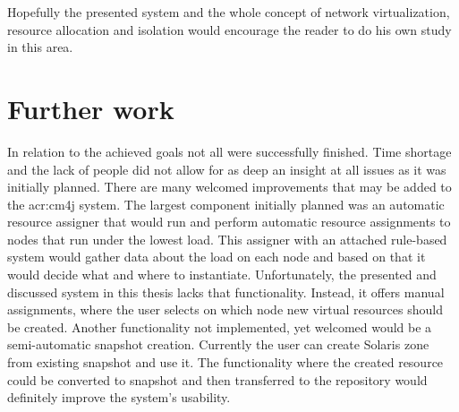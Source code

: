 \documentclass[11pt,openany]{book}
\begin{document}
      Hopefully the presented system and the whole concept of network virtualization, resource allocation and isolation
      would encourage the reader to do his own study in this area.
		

    \section{Further work}
		\label{sub:sum:further}
	
      In relation to the achieved goals not all were successfully finished. Time shortage and the lack of people did not
      allow for as deep an insight at all issues as it was initially planned. There are many welcomed improvements that
      may be added to the \gls{acr:cm4j} system. The largest component initially planned was an automatic resource
      assigner that would run and perform automatic resource assignments to nodes that run under the lowest load. This
      assigner with an attached rule-based system would gather data about the load on each node and based on that it
      would decide what and where to instantiate. Unfortunately, the presented and discussed system in this thesis lacks
      that functionality. Instead, it offers manual assignments, where the user selects on which node new virtual
      resources should be created. Another functionality not implemented, yet welcomed would be a semi-automatic
      snapshot creation. Currently the user can create Solaris zone from existing snapshot and use it. The functionality
      where the created resource could be converted to snapshot and then transferred to the repository would definitely
      improve the system's usability. 


  \printglossaries

  
  
\end{document}

